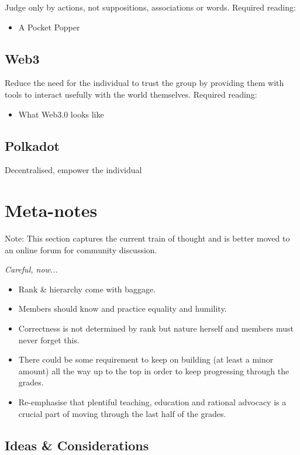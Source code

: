 \documentclass[9pt,oneside]{amsart}
\begin{document}
Judge only by actions, not suppositions, associations or words. Required reading:

\begin{itemize}
\item
  A Pocket Popper
\end{itemize}

\subsection{Web3}\label{web3}

Reduce the need for the individual to trust the group by providing them with tools to interact usefully with the world themselves. Required reading:

\begin{itemize}
\item
  What Web3.0 looks like
\end{itemize}

\subsection{Polkadot}\label{polkadot}

Decentralised, empower the individual

\section{Meta-notes}\label{meta-notes}

Note: This section captures the current train of thought and is better moved to an online forum for community discussion.

\emph{Careful, now...}
\begin{itemize}
  \item Rank \& hierarchy come with baggage.
  \item Members should know and practice equality and humility.
  \item Correctness is not determined by rank but nature herself and members must never forget this.
  \item There could be some requirement to keep on building (at least a minor amount) all the way up to the top in order to keep progressing through the grades.
  \item Re-emphasise that plentiful teaching, education and rational advocacy is a crucial part of moving through the last half of the grades.
\end{itemize}

\subsection{Ideas \& Considerations}\label{ideas-considerations}
\end{document}
